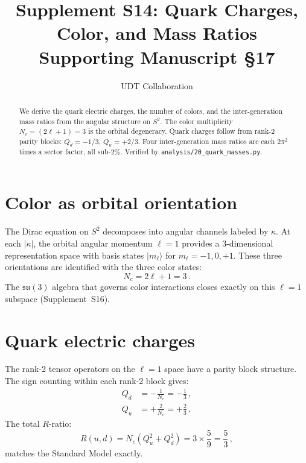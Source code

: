 \documentclass[11pt,letterpaper]{article}
\title{Supplement S14: Quark Charges, Color, and Mass Ratios \\
\large Supporting Manuscript \S17}
\author{UDT Collaboration}
\date{}
\numberwithin{equation}{section}
\begin{document}
\maketitle

\begin{abstract}
We derive the quark electric charges, the number of colors, and the
inter-generation mass ratios from the angular structure on $S^2$.
The color multiplicity $N_c = (2\ell+1) = 3$ is the orbital degeneracy.
Quark charges follow from rank-2 parity blocks: $Q_d = -1/3$,
$Q_u = +2/3$.  Four inter-generation mass ratios are each $2\pi^2$
times a sector factor, all sub-$2\%$.  Verified by
\texttt{analysis/20\_quark\_masses.py}.
\end{abstract}

\tableofcontents

\section{Color as orbital orientation}

The Dirac equation on $S^2$ decomposes into angular channels labeled
by $\kappa$.  At each $|\kappa|$, the orbital angular momentum
$\ell = 1$ provides a 3-dimensional representation space with basis
states $|m_\ell\rangle$ for $m_\ell = -1, 0, +1$.  These three
orientations are identified with the three color states:
\begin{equation}
  N_c = 2\ell + 1 = 3\,.
\end{equation}
The $\mathfrak{su}(3)$ algebra that governs color interactions closes
exactly on this $\ell = 1$ subspace (Supplement~S16).

\section{Quark electric charges}

The rank-2 tensor operators on the $\ell = 1$ space have a parity
block structure.  The sign counting within each rank-2 block gives:
\begin{align}
  Q_d &= -\frac{1}{N_c} = -\frac{1}{3}\,,\\
  Q_u &= +\frac{2}{N_c} = +\frac{2}{3}\,.
\end{align}
The total $R$-ratio:
\begin{equation}
  R(u,d) = N_c(Q_u^2 + Q_d^2) = 3 \times \frac{5}{9} = \frac{5}{3}\,,
\end{equation}
matches the Standard Model exactly.
\end{document}
